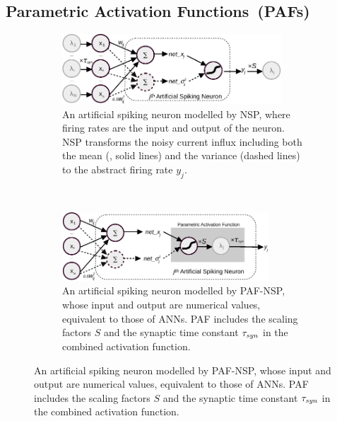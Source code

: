 	\subsection{Parametric Activation Functions~(PAFs)}
	\label{subsec:PAF}
	\begin{figure}[tbh!]
		\centering
		\begin{subfigure}[t]{\textwidth}
			\centering
			\DIFdelbeginFL %
\DIFdelendFL \DIFaddbeginFL \includegraphics[width=0.9\textwidth]{pics_iconip/neuron_o.pdf}
			\bigskip
			\DIFaddendFL \caption{An artificial spiking neuron modelled by NSP, where firing rates are the input and output of the neuron. NSP transforms the noisy current influx including both the mean (\DIFdelbeginFL {}\DIFdelendFL \DIFaddbeginFL {}\DIFaddendFL , solid lines) and the variance \DIFdelbeginFL {}\DIFdelendFL \DIFaddbeginFL {}\DIFaddendFL (dashed lines) to the abstract firing rate $y_j$.}
		\end{subfigure}\\\bigskip\DIFaddbeginFL \bigskip
		\DIFaddendFL \begin{subfigure}[t]{\textwidth}
			\centering
			\DIFdelbeginFL %
\DIFdelendFL \DIFaddbeginFL \includegraphics[width=0.85\textwidth]{pics_iconip/neuron_PAF.pdf}
			\bigskip
			\DIFaddendFL \caption{An artificial spiking neuron modelled by PAF-NSP, whose input and output are numerical values, equivalent to those of ANNs. PAF includes the scaling factors $S$ and the synaptic time constant $\tau_{\textit{\textrm{syn}}}$ in the combined activation function.}

\end{subfigure}
\end{figure}

